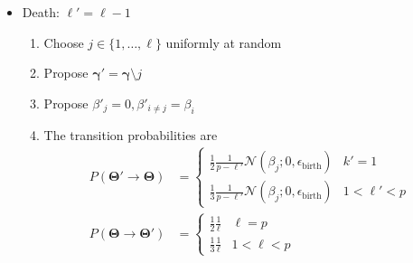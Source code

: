 \documentclass[a4paper,12pt]{article}
\begin{document}
\begin{itemize}
    \item Death: $\ell' = \ell-1$
    \begin{enumerate}
        \item Choose $j \in \{1, \ldots, \ell\}$ uniformly at random
        \item Propose $\mathbf{\gamma}' = \mathbf{\gamma} \setminus j$ 
        \item Propose $\beta'_{j} = 0, \beta'_{i \neq j} = \beta_{i}$
        \item The transition probabilities are 
        \begin{align*}
            P(\mathbf{\Theta}' \rightarrow \mathbf{\Theta}) &= \begin{cases}\frac{1}{2}\frac{1}{p-\ell'} \mathcal{N}(\beta_{j}; 0,\epsilon_{\text{birth}}) & k'=1 \\ \frac{1}{3} \frac{1}{p-\ell'} \mathcal{N}(\beta_{j}; 0,\epsilon_{\text{birth}}) & 1<\ell'<p \end{cases} \\ P(\mathbf{\Theta} \rightarrow \mathbf{\Theta}') &= \begin{cases}\frac{1}{2}\frac{1}{\ell} & \ell=p \\ \frac{1}{3} \frac{1}{\ell} & 1<\ell<p \end{cases} 
        \end{align*}
    \end{enumerate}
\end{itemize}
\end{document}
